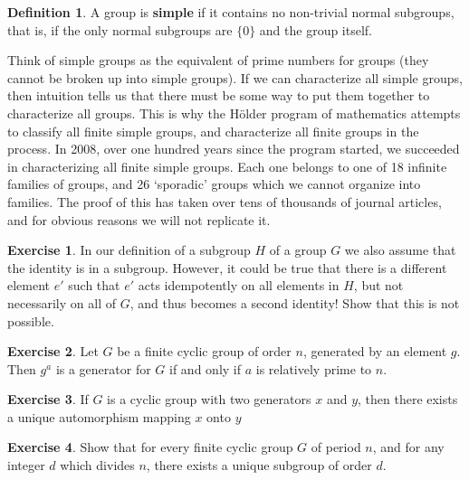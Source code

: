 \documentclass[12pt]{amsbook}
\theoremstyle{definition}
\newtheorem{exercise}{Exercise}[chapter]
\newtheorem{definition}{Definition}
\begin{document}
\begin{definition}
    A group is {\bf simple}  if it contains no non-trivial normal subgroups, that is, if the only normal subgroups are $\{ 0 \}$ and the group itself.
\end{definition}

Think of simple groups as the equivalent of prime numbers for groups (they cannot be broken up into simple groups). If we can characterize all simple groups, then intuition tells us that there must be some way to put them together to characterize all groups. This is why the H\"{o}lder program of mathematics attempts to classify all finite simple groups, and characterize all finite groups in the process. In 2008, over one hundred years since the program started, we succeeded in characterizing all finite simple groups. Each one belongs to one of 18 infinite families of groups, and 26 `sporadic' groups which we cannot organize into families. The proof of this has taken over tens of thousands of journal articles, and for obvious reasons we will not replicate it.

\clearpage

\begin{exercise}
    In our definition of a subgroup $H$ of a group $G$ we also assume that the identity is in a subgroup. However, it could be true that there is a different element $e'$ such that $e'$ acts idempotently on all elements in $H$, but not necessarily on all of $G$, and thus becomes a second identity! Show that this is not possible.
\end{exercise}

\begin{exercise}
    Let $G$ be a finite cyclic group of order $n$, generated by an element $g$. Then $g^a$ is a generator for $G$ if and only if $a$ is relatively prime to $n$.
\end{exercise}

\begin{exercise}
    If $G$ is a cyclic group with two generators $x$ and $y$, then there exists a unique automorphism mapping $x$ onto $y$
\end{exercise}

\begin{exercise}
    Show that for every finite cyclic group $G$ of period $n$, and for any integer $d$ which divides $n$, there exists a unique subgroup of order $d$.
\end{exercise}
\end{document}
